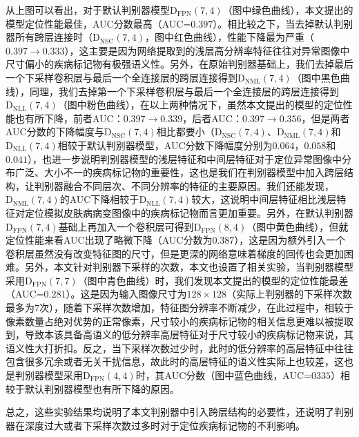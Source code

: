 从上图可以看出，对于默认判别器模型$\mathrm{D}_\mathrm{FPN}(7,4)$（图中绿色曲线），本文提出的模型定位性能最佳，AUC分数最高（AUC=$0.397$）。相比较之下，当去掉默认判别器所有跨层连接时（$\mathrm{D}_\mathrm{NSC}(7,4)$，图中红色曲线），性能下降最为严重（$0.397\rightarrow 0.333$），这主要是因为网络提取到的浅层高分辨率特征往往对异常图像中尺寸偏小的疾病标记物有极强语义性。另外，在原始判别器基础上，我们去掉最后一个下采样卷积层与最后一个全连接层的跨层连接得到$\mathrm{D}_\mathrm{NML}(7,4)$（图中黑色曲线），同理，我们去掉第一个下采样卷积层与最后一个全连接层的跨层连接得到$\mathrm{D}_\mathrm{NLL}(7,4)$（图中粉色曲线），在以上两种情况下，虽然本文提出的模型的定位性能也有所下降，前者AUC：$0.397\rightarrow 0.339$，后者AUC：$0.397\rightarrow 0.356$，但是两者AUC分数的下降幅度与$\mathrm{D}_\mathrm{NSC}(7,4)$相比都要小（$\mathrm{D}_\mathrm{NSC}(7,4)$、$\mathrm{D}_\mathrm{NML}(7,4)$和$\mathrm{D}_\mathrm{NLL}(7,4)$相较于默认判别器模型，AUC分数下降幅度分别为$0.064$，$0.058$和$0.041$），也进一步说明判别器模型的浅层特征和中间层特征对于定位异常图像中分布广泛、大小不一的疾病标记物的重要性，这也是我们在判别器模型中加入跨层结构，让判别器融合不同层次、不同分辨率的特征的主要原因。我们还能发现，$\mathrm{D}_\mathrm{NML}(7,4)$的AUC下降相较于$\mathrm{D}_\mathrm{NLL}(7,4)$较大，这说明中间层特征相比浅层特征对定位模拟皮肤病病变图像中的疾病标记物而言更加重要。另外，在默认判别器$\mathrm{D}_\mathrm{FPN}(7,4)$基础上再加入一个卷积层可得到$\mathrm{D}_\mathrm{FPN}(8,4)$（图中黄色曲线），但就定位性能来看AUC出现了略微下降（AUC分数为$0.387$），这是因为额外引入一个卷积层虽然没有改变特征图的尺寸，但是更深的网络意味着梯度的回传也会更加困难。另外，本文针对判别器下采样的次数，本文也设置了相关实验，当判别器模型采用$\mathrm{D}_\mathrm{FPN}(7,7)$（图中青色曲线）时，我们发现本文提出的模型的定位性能最差（AUC=$0.281$）。这是因为输入图像尺寸为$128\times 128$（实际上判别器的下采样次数最多为$7$次），随着下采样次数增加，特征图分辨率不断减少，在此过程中，相较于像素数量占绝对优势的正常像素，尺寸较小的疾病标记物的相关信息更难以被提取到，导致本该具备高语义的低分辨率高层特征对于尺寸较小的疾病标记物来说，其语义性大打折扣。反之，当下采样次数过少时，此时的低分辨率的高层特征中往往包含很多冗余或者无关干扰信息，故此时的高层特征的语义性实际上也较差，这也是判别器模型采用$\mathrm{D}_\mathrm{FPN}(4,4)$时，其AUC分数（图中蓝色曲线，AUC=$0335$）相较于默认判别器模型也有所下降的原因。

总之，这些实验结果均说明了本文判别器中引入跨层结构的必要性，还说明了判别器在深度过大或者下采样次数过多时对于定位疾病标记物的不利影响。

